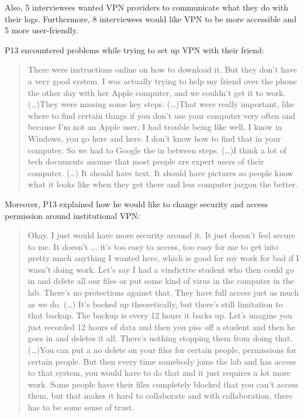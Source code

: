 Also, 5 interviewees wanted VPN providers to communicate what they do with their logs. Furthermore, 8 interviewees would like VPN to be more accessible and 5 more user-friendly. 

P13 encountered problems while trying to set up VPN with their friend:
\begin{quote}There were instructions online on how to download it. But they don't have a very good system. I was actually trying to help my friend over the phone the other day with her Apple computer, and we couldn't get it to work. (\dots)They were missing some key steps. (\dots)That were really important, like where to find certain things if you don't use your computer very often and because I'm not an Apple user, I had trouble being like well, I know in Windows, you go here and here. I don't know how to find that in your computer. So we had to Google the in between steps. (\dots)I think a lot of tech documents assume that most people are expert users of their computer. (\dots) It should have text. It should have pictures so people know what it looks like when they get there and less computer jargon the better.\end{quote}

Moreover, P13 explained how he would like to change security and access permission around institutional VPN:
\begin{quote}Okay. I just would have more security around it. It just doesn't feel secure to me. It doesn't ... it's too easy to access, too easy for me to get into pretty much anything I wanted here, which is good for my work for bad if I wasn't doing work. Let's say I had a vindictive student who then could go in and delete all our files or put some kind of virus in the computer in the lab. There's no protections against that. They have full access just as much as we do. (…) It's backed up theoretically, but there's still limitation to that backup. The backup is every 12 hours it backs up. Let's imagine you just recorded 12 hours of data and then you piss off a student and then he goes in and deletes it all. There's nothing stopping them from doing that. 
(\dots)You can put a no delete on your files for certain people, permissions for certain people. But then every time somebody joins the lab and has access to that system, you would have to do that and it just requires a lot more work. Some people have their files completely blocked that you can't access them, but that makes it hard to collaborate and with collaboration, there has to be some sense of trust.\end{quote}



